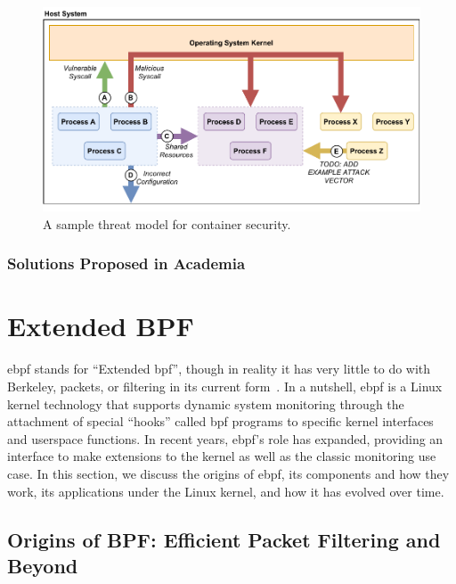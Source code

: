\begin{figure}[tbp]
  \centering
  \includegraphics[width=0.8\linewidth]{figs/background/container_security.pdf}
  \caption[A sample threat model for container security]{
    A sample threat model for container security.
  }%
  \label{fig:containersec}
\end{figure}

\subsubsection{Solutions Proposed in Academia}%
\label{sss:container-security-academia}




\section{Extended BPF}%
\label{s:ebpf-bg}

\gls{ebpf} stands for \enquote{Extended \gls{bpf}}, though in reality it has very
little to do with Berkeley, packets, or filtering in its current
form~\cite{gregg2019_bpf}. In a nutshell, \gls{ebpf} is a Linux kernel technology that supports
dynamic system monitoring through the attachment of special \enquote{hooks} called \gls{bpf}
programs to specific kernel interfaces and userspace functions. In recent years, \gls{ebpf}'s
role has expanded, providing an interface to make extensions to the kernel as well as the
classic monitoring use case. In this section, we discuss the origins of \gls{ebpf}, its
components and how they work, its applications under the Linux kernel, and how it has
evolved over time.


\subsection{Origins of BPF\@: Efficient Packet Filtering and Beyond}%
\label{ss:origins-of-bpf-bg}

